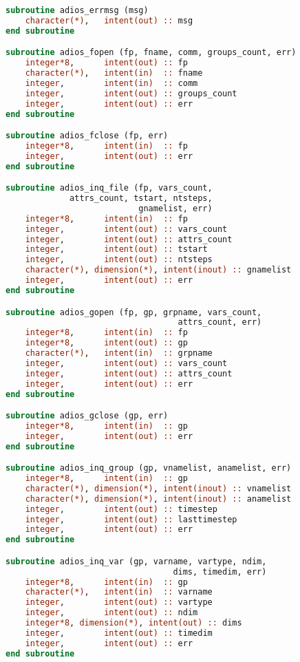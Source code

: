 \documentclass{report}
\begin{document}
\begin{lstlisting}[language=Fortran]
subroutine adios_errmsg (msg)
    character(*),   intent(out) :: msg
end subroutine

subroutine adios_fopen (fp, fname, comm, groups_count, err)
    integer*8,      intent(out) :: fp
    character(*),   intent(in)  :: fname
    integer,        intent(in)  :: comm
    integer,        intent(out) :: groups_count
    integer,        intent(out) :: err
end subroutine

subroutine adios_fclose (fp, err)
    integer*8,      intent(in)  :: fp
    integer,        intent(out) :: err
end subroutine

subroutine adios_inq_file (fp, vars_count, 
             attrs_count, tstart, ntsteps, 
                           gnamelist, err)
    integer*8,      intent(in)  :: fp
    integer,        intent(out) :: vars_count
    integer,        intent(out) :: attrs_count
    integer,        intent(out) :: tstart
    integer,        intent(out) :: ntsteps
    character(*), dimension(*), intent(inout) :: gnamelist
    integer,        intent(out) :: err
end subroutine

subroutine adios_gopen (fp, gp, grpname, vars_count, 
                                   attrs_count, err)
    integer*8,      intent(in)  :: fp
    integer*8,      intent(out) :: gp
    character(*),   intent(in)  :: grpname
    integer,        intent(out) :: vars_count
    integer,        intent(out) :: attrs_count
    integer,        intent(out) :: err
end subroutine

subroutine adios_gclose (gp, err)
    integer*8,      intent(in)  :: gp
    integer,        intent(out) :: err
end subroutine

subroutine adios_inq_group (gp, vnamelist, anamelist, err)
    integer*8,      intent(in)  :: gp
    character(*), dimension(*), intent(inout) :: vnamelist
    character(*), dimension(*), intent(inout) :: anamelist
    integer,        intent(out) :: timestep
    integer,        intent(out) :: lasttimestep
    integer,        intent(out) :: err
end subroutine

subroutine adios_inq_var (gp, varname, vartype, ndim, 
                                  dims, timedim, err)
    integer*8,      intent(in)  :: gp
    character(*),   intent(in)  :: varname
    integer,        intent(out) :: vartype
    integer,        intent(out) :: ndim
    integer*8, dimension(*), intent(out) :: dims
    integer,        intent(out) :: timedim
    integer,        intent(out) :: err
end subroutine


\end{lstlisting}
\end{document}
